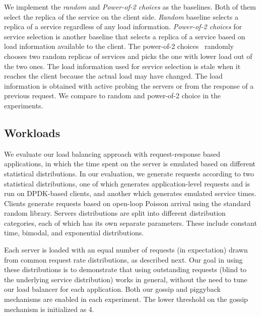 We implement the \textit{random} and \textit{Power-of-2 choices} as the baselines. 
%
Both of them select the replica of the service on the client side. 
%
\textit{Random} baseline selects a replica of a service regardless of any load information.
%
\textit{Power-of-2 choices} for service selection is another baseline that selects a replica of a service based on load information available to the client.
%
The power-of-2 choices~\cite{power_of_2} randomly chooses two random replicas of services and picks the one with lower load out of the two ones.   
%
The load information used for service selection is stale when it reaches the client because the actual load may have changed.
%
The load information is obtained with active probing the servers or from the response of a previous request.
%
%
We compare \daronpon to random and power-of-2 choice in
the experiments.

\subsection{Workloads}
%
We evaluate our load balancing approach with request-response based 
applications, in which the time spent on the server is emulated based on 
different statistical distributions.
%
In our evaluation, we generate requests according to two
statistical distributions, one of which generates application-level requests
and is run on DPDK-based clients, and another which generates emulated service
times. 
%
Clients generate requests based on open-loop Poisson arrival using the
standard random library.  
%
Servers distributions are split into different distribution categories, each of which has its own separate parameters. 
%
These include constant time, bimodal, and exponential distributions. 

Each server is loaded with an equal number of requests (in expectation)
drawn from common request rate distributions, as described next.
Our goal in using these distributions is to demonstrate that
using outstanding requests (blind to the underlying
service distribution) works in general, without the need to tune
our load balancer for each application.  
%
Both our gossip and piggyback mechanisms are enabled in each experiment. 
%
The lower threshold on the gossip mechanism is initialized as 4.

